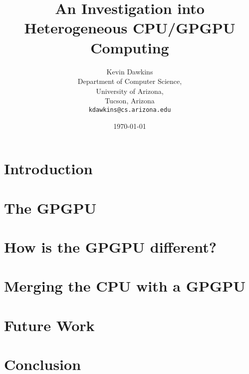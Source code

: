 \documentclass[12pt,notitlepage]{report}
\begin{document}
\setcounter{tocdepth}{4}

\title{An Investigation into Heterogeneous CPU/GPGPU Computing}
\author{Kevin Dawkins\\
  Department of Computer Science,\\
  University of Arizona,\\
  Tucson, Arizona\\
  \texttt{kdawkins@cs.arizona.edu}}
\date{\today}
\maketitle




\tableofcontents


\chapter*{Introduction}


\chapter*{The GPGPU}


\chapter*{How is the GPGPU different?}


\chapter*{Merging the CPU with a GPGPU}


\chapter*{Future Work}


\chapter*{Conclusion}


\nocite{nvidia, mapreduce, cpuassist}




\end{document}
